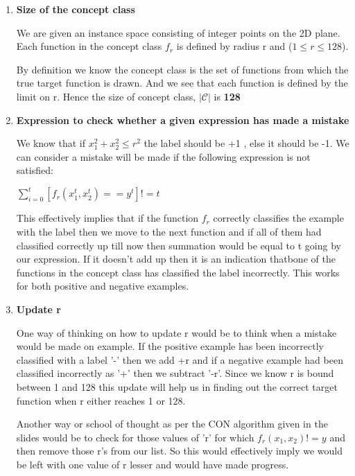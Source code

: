 \documentclass[12pt, fullpage,letterpaper]{article}
\begin{document}
\begin{enumerate}
	
	\item \textbf{ Size of the concept class}
	
	We are given an instance space consisting of integer points on the 2D plane. Each function in the concept class $f_r$ is defined by radius r and ($1 \leq r \leq 128$).
	
	By definition we know the concept class is the set of functions from which the true target function is drawn. And we see that each function is defined by the limit on r. Hence the size of concept class, $|\mathcal{C}|$ is \textbf{128}
	
	\item \textbf{Expression to check whether a given expression has made a mistake}
	
	We know that if $x_1^2 +x_2^2 \leq r^2$ the label should be +1 , else it should be -1. We can consider  a mistake will be made if the following expression is not satisfied:
	
	\begin{center}
		$\sum_{i=0}^{t} [f_r(x_1^t,x_2^t)==y^t ]  !=t $
	\end{center} 
	
	This effectively implies that if the function $f_r$ correctly classifies the example  with the label then we move to the next function and if all of them had classified correctly up till now then summation would be equal to t going by our expression. If it doesn't add up then it is an indication thatbone of the functions in the concept class has classified the label incorrectly. This works for both positive and negative examples.
	
	\item \textbf{ Update r}
	 
	 One way of thinking on how to update r would be to think when a mistake would be made on example. If the positive example has been incorrectly classified with a label '-' then we add +r and if a negative example had been classified incorrectly as '+' then we subtract '-r'. Since we know r is bound between 1 and 128 this update will help us in finding out the correct target function when r either reaches 1 or 128.
	 
	 Another way or school of thought as per the CON algorithm given in the slides would be to check for those values of 'r' for which $f_r(x_1,x_2) != y$ and then remove those r's from our list. So this would effectively imply we would be left with one value of r lesser and would have made progress.
	 

\end{enumerate}
\end{document}
